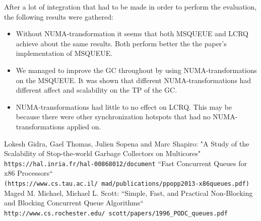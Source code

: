 \documentclass{article}
\begin{document}
 After a lot of integration that had to be made in order to perform the evaluation, the following results were gathered:

 \begin{itemize}
   \item Without NUMA-transformation it seems that both MSQUEUE and LCRQ achieve about the same results. Both perform better the the paper's implementation of MSQUEUE.
   \item We managed to improve the GC throughout by using NUMA-transformations on the MSQUEUE. It was shown that different NUMA-transformations had different affect and scalability on the TP of the GC.
   \item NUMA-transformations had little to no effect on LCRQ. This may be because there were other synchronization hotspots that had no NUMA-transformations applied on.
 \end{itemize}

  \medskip
  \newpage

  \begin{thebibliography}{9}
      Lokesh Gidra, Gael Thomas, Julien Sopena and Marc Shapiro: "A Study of the Scalability of Stop-the-world Garbage Collectors on Multicores"
      \\\texttt{https://hal.inria.fr/hal-00868012/document}
      ``Fast Concurrent Queues for x86 Processors``
      \\\texttt{(https://www.cs.tau.ac.il/~mad/publications/ppopp2013-x86queues.pdf)}
	    Maged M. Michael, Michael L. Scott: ``Simple, Fast, and Practical Non-Blocking and Blocking Concurrent Queue Algorithms``
      \\\texttt{http://www.cs.rochester.edu/~scott/papers/1996\_PODC\_queues.pdf}
  \end{thebibliography}
\end{document}
